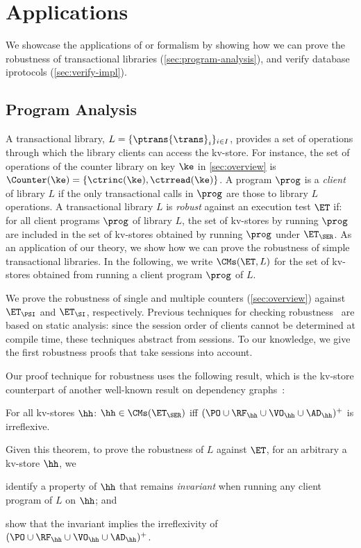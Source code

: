 \section{Applications}
\label{sec:applications}

We showcase the applications of or formalism by showing how we can prove the robustness of transactional libraries (\cref{sec:program-analysis}), and verify database iprotocols
 (\cref{sec:verify-impl}).

\vspace*{-4pt}
\subsection{Program Analysis}
\vspace*{-4pt}
\label{sec:program-analysis}
A transactional library, $L = \{\ptrans{\trans}_{i}\}_{i \in I}$, 
provides a set of operations through which the library clients can access the kv-store. 
For instance, the set of operations of the counter library on key $\ke$ in \cref{sec:overview} is $\Counter(\ke) = \{\ctrinc(\ke), \ctrread(\ke)\}$.
A program $\prog$ is a \emph{client} of library $L$ if the only transactional calls in $\prog$ are those to library $L$ operations.  
A transactional library $L$ is \emph{robust} against an execution test $\ET$ if: 
for all client programs $\prog$ of library $L$, the set of kv-stores by running $\prog$ are included in the set of kv-stores obtained by running $\prog$ under $\ET_{\SER}$.
As an application of our theory, we show how we can prove the robustness of simple transactional libraries. 
In the following, we write $\CMs(\ET, L)$ for the set of kv-stores obtained from running a client program $\prog$ of $L$. 

We prove the robustness of single and multiple counters (\cref{sec:overview}) against $\ET_{\PSI}$ and $\ET_{\SI}$, respectively.
Previous techniques for checking robustness~\cite{giovanni_concur16,SIanalysis,laws,sureshConcur} 
are based on static analysis: since the session order of clients cannot be determined at compile 
time, these techniques abstract from sessions. 
To our knowledge, we give the first robustness proofs that take sessions into account.

Our proof technique for robustness uses the following result, which is the kv-store counterpart of another well-known result on dependency graphs~\cite{adya}:
\begin{theorem}
\label{thm:serialisable_nocycle}
For all kv-stores $\hh$: $\hh \in \CMs(\ET_{\SER})$ iff $(\PO \cup \RF_{\hh} 
\cup \VO_{\hh} \cup \AD_{\hh})^{+}$ is irreflexive.
\end{theorem}
Given this theorem, to prove the robustness of $L$ against $\ET$, 
for an arbitrary a kv-store $\hh$, we 
\begin{enumerate*}
	\item identify a property of $\hh$ that remains \emph{invariant} when running any client program of $L$ on $\hh$; and 
	\item show that the invariant implies the irreflexivity of $(\PO \cup \RF_{\hh} \cup \VO_{\hh} \cup \AD_{\hh})^{+}$.
\end{enumerate*}

